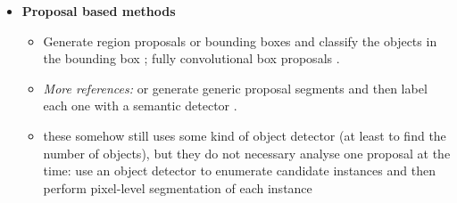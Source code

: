 \begin{itemize}




\item \textbf{Proposal based methods} 
\begin{itemize}
\item Generate region proposals or bounding boxes and classify the objects in the bounding box \cite{yang2012layered,ladicky2010and,hariharan2014simultaneous,chen2015multi,dai2016instance,liang2016reversible,he2017mask}; fully convolutional  box proposals \cite{li2017fully}. 
\item \emph{More references:} or generate generic proposal segments and then label each one with a semantic detector \cite{hariharan2014simultaneous,chen2015multi,hariharan2015hypercolumns,dai2015convolutional,uhrig2016pixel,he2017mask}.
\item these somehow still uses some kind of object detector (at least to find the number of objects), but they do not necessary analyse one proposal at the time: use an object detector to enumerate candidate instances and then perform pixel-level segmentation of each instance \cite{liang2018proposal,dai2016instance,li2017fully,liang2016reversible,arnab2017pixelwise} 
\end{itemize}


\end{itemize}
